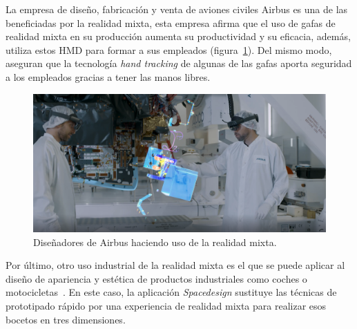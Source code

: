 La empresa de diseño, fabricación y venta de aviones civiles Airbus es una de las beneficiadas por la realidad mixta, esta empresa afirma que el uso de gafas de realidad mixta en su producción aumenta su productividad y su eficacia, además, utiliza estos HMD para formar a sus empleados (figura~\ref{fig:ingenierosAirbusHololens2}). Del mismo modo, aseguran que la tecnología \textit{hand tracking} de algunas de las gafas aporta seguridad a los empleados gracias a tener las manos libres. 

\begin{figure}[h]
    \centering
    \includegraphics[scale=0.3]{Images/Estado del arte/ingenierosAirbus.png}
    \caption[Diseñadores de Airbus haciendo uso de la realidad mixta]{Diseñadores de Airbus haciendo uso de la realidad mixta\footnotemark.}
    \label{fig:ingenierosAirbusHololens2}
\end{figure}


Por último, otro uso industrial de la realidad mixta es el que se puede aplicar al diseño de apariencia y estética de productos industriales como coches o motocicletas~\cite{mrinaesthethics}. En este caso, la aplicación \textit{Spacedesign} sustituye las técnicas de prototipado rápido por una experiencia de realidad mixta para realizar esos bocetos en tres dimensiones.
